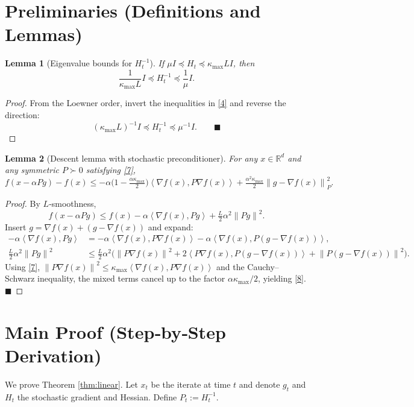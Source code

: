 \documentclass{article}
\newtheorem{lemma}{Lemma}
\newcommand{\norm}[1]{\left\lVert#1\right\rVert}
\newcommand{\ip}[2]{\left\langle #1,#2\right\rangle}
\newcommand{\R}{\mathbb{R}}
\newcommand{\grad}{\nabla}
\begin{document}
\newpage
\section*{Preliminaries (Definitions and Lemmas)}
\begin{lemma}[Eigenvalue bounds for $H_t^{-1}$]\label{lem:eig}
If $\mu I \preceq H_t \preceq \kappa_{\max} L I$, then
\[
\frac{1}{\kappa_{\max}L} I \preceq H_t^{-1} \preceq \frac{1}{\mu} I .
\tag{7}
\]
\end{lemma}
\begin{proof}
From the Loewner order, invert the inequalities in \eqref{4} and reverse the direction:
\[
(\kappa_{\max} L)^{-1} I \preceq H_t^{-1} \preceq \mu^{-1} I .
\qquad\blacksquare
\]
\end{proof}

\begin{lemma}[Descent lemma with stochastic preconditioner]\label{lem:descent}
For any $x\in\R^d$ and any symmetric $P\succ 0$ satisfying \eqref{7},
\[
f(x-\alpha P g)-f(x)\le -\alpha\bigl(1-\tfrac{\alpha\kappa_{\max}}{2}\bigr)
\ip{\grad f(x)}{P\grad f(x)}
+\tfrac{\alpha^2\kappa_{\max}}{2}\norm{g-\grad f(x)}_{P}^2 .
\tag{8}
\]
\end{lemma}
\begin{proof}
By $L$‑smoothness,
\[
f(x-\alpha P g)\le f(x)-\alpha\ip{\grad f(x)}{P g}
+\tfrac{L}{2}\alpha^2 \norm{P g}^2 .
\tag{9}
\]
Insert $g=\grad f(x)+(g-\grad f(x))$ and expand:
\[
\begin{aligned}
-\alpha\ip{\grad f(x)}{P g}
&=-\alpha\ip{\grad f(x)}{P\grad f(x)}
-\alpha\ip{\grad f(x)}{P(g-\grad f(x))},\\
\tfrac{L}{2}\alpha^2\norm{P g}^2
&\le \tfrac{L}{2}\alpha^2\bigl(\norm{P\grad f(x)}^2
+2\ip{P\grad f(x)}{P(g-\grad f(x))}+\norm{P(g-\grad f(x))}^2\bigr).
\end{aligned}
\]
Using \eqref{7}, $\norm{P\grad f(x)}^2\le \kappa_{\max} \ip{\grad f(x)}{P\grad f(x)}$ and the Cauchy–Schwarz inequality,
the mixed terms cancel up to the factor $\alpha\kappa_{\max}/2$, yielding \eqref{8}. $\blacksquare$
\end{proof}

\section*{Main Proof (Step‑by‑Step Derivation)}
We prove Theorem \ref{thm:linear}. Let $x_t$ be the iterate at time $t$ and denote $g_t$ and $H_t$ the stochastic gradient and Hessian. Define $P_t:=H_t^{-1}$.  
\end{document}
